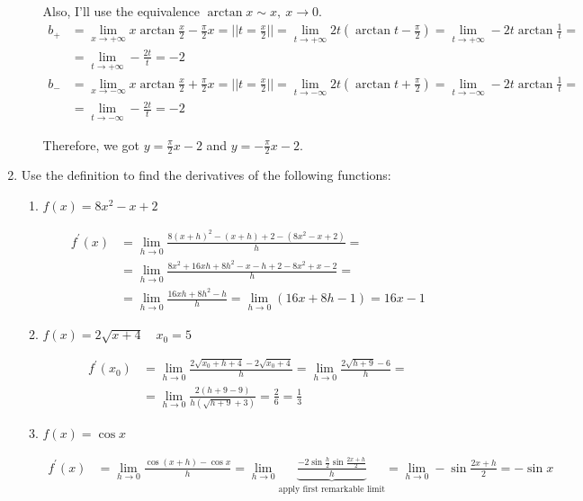 \documentclass{article}
\begin{document}
\begin{enumerate}
\begin{enumerate}
Also, I'll use the equivalence $\arctan{x} \sim x, \: x \to 0$.
\begin{align*}
b_{+}&=\lim_{x \to +\infty} x\arctan{\frac{x}{2}}-\frac{\pi}{2}x=\bigg|\bigg|t=\frac{x}{2}\bigg|\bigg|=\lim_{t \to +\infty} 2t(\arctan{t}-\frac{\pi}{2})=\lim_{t \to +\infty} -2t\arctan{\frac{1}{t}}=\\
&=\lim_{t \to +\infty} -\frac{2t}{t}=-2\\
b_{-}&=\lim_{x \to -\infty} x\arctan{\frac{x}{2}}+\frac{\pi}{2}x=\bigg|\bigg|t=\frac{x}{2}\bigg|\bigg|=\lim_{t \to -\infty} 2t(\arctan{t}+\frac{\pi}{2})=\lim_{t \to -\infty} -2t\arctan{\frac{1}{t}}=\\
&=\lim_{t \to -\infty} -\frac{2t}{t}=-2
\end{align*}

Therefore, we got $y=\frac{\pi}{2}x-2$ and $y=-\frac{\pi}{2}x-2$.

\end{enumerate}

\item Use the definition to find the derivatives of the following functions:

\begin{enumerate}
\item $f(x) = 8x^2 - x + 2$

\begin{align*}
f^\prime(x)&=\lim_{h \to 0} \frac{8(x+h)^2-(x+h)+2-(8x^2-x+2)}{h}=\\
&=\lim_{h \to 0} \frac{8x^2+16xh+8h^2-x-h+2-8x^2+x-2}{h}=\\
&=\lim_{h \to 0} \frac{16xh+8h^2-h}{h}=\lim_{h \to 0} (16x+8h-1)=16x-1
\end{align*}

\item $f(x) = 2\sqrt{x+4} \quad x_0=5$

\begin{align*}
f^\prime(x_0)&=\lim_{h \to 0} \frac{2\sqrt{x_0+h+4}-2\sqrt{x_0+4}}{h}=\lim_{h \to 0} \frac{2\sqrt{h+9}-6}{h}=\\
&=\lim_{h \to 0} \frac{2(h+9-9)}{h(\sqrt{h+9}+3)}=\frac{2}{6}=\frac{1}{3}
\end{align*}

\item $f(x)=\cos{x}$

\begin{align*}
f^\prime(x)&=\lim_{h \to 0} \frac{\cos{(x+h)}-\cos{x}}{h}=\lim_{h \to 0} \underbrace{\frac{-2\sin{\frac{h}{2}}\sin{\frac{2x+h}{2}}}{h}}_{\text{apply first remarkable limit}}=\lim_{h \to 0} -\sin{\frac{2x+h}{2}}=-\sin{x}
\end{align*}


\end{enumerate}
\end{enumerate}
\end{document}
